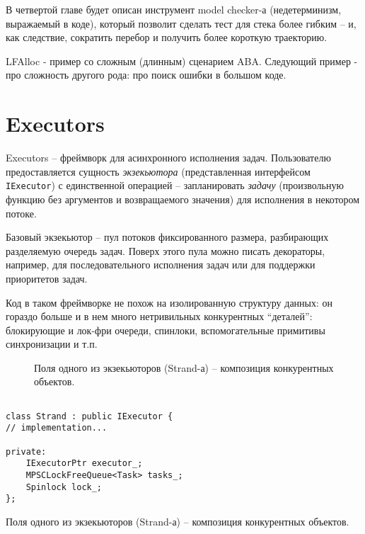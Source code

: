 В четвертой главе будет описан инструмент model checker-а (недетерминизм, выражаемый в коде), который позволит сделать тест для стека более гибким – и, как следствие, сократить перебор и получить более короткую траекторию.

LFAlloc - пример со сложным (длинным) сценарием ABA. Следующий пример - про сложность другого рода: про поиск ошибки в большом коде.

\section{Executors}

Executors – фреймворк для асинхронного исполнения задач. Пользователю предоставляется сущность \emph{экзекьютора} (представленная интерфейсом \texttt{IExecutor}) с единственной операцией – запланировать \emph{задачу} (произвольную функцию без аргументов и возвращаемого значения) для исполнения в некотором потоке.

Базовый экзекьютор – пул потоков фиксированного размера, разбирающих разделяемую очередь задач. Поверх этого пула можно писать декораторы, например, для последовательного исполнения задач или для поддержки приоритетов задач.

Код в таком фреймворке не похож на изолированную структуру данных: он гораздо больше и в нем много нетривильных конкурентных “деталей”: блокирующие и лок-фри очереди, спинлоки, вспомогательные примитивы синхронизации и т.п.


\begin{figure}
	\bigskip
	\caption{Поля одного из экзекьюторов (Strand-а) – композиция конкурентных объектов.}\label{fig:strandfields}
\end{figure}

\else

\begin{listing}
	\centering
	
	\begin{verbatim}
    
class Strand : public IExecutor {
// implementation...

private:
	IExecutorPtr executor_;
	MPSCLockFreeQueue<Task> tasks_;
	Spinlock lock_;
};

	\end{verbatim}
	\caption{Поля одного из экзекьюторов (Strand-а) – композиция конкурентных объектов.}
	\label{strandfields}
\end{listing}

